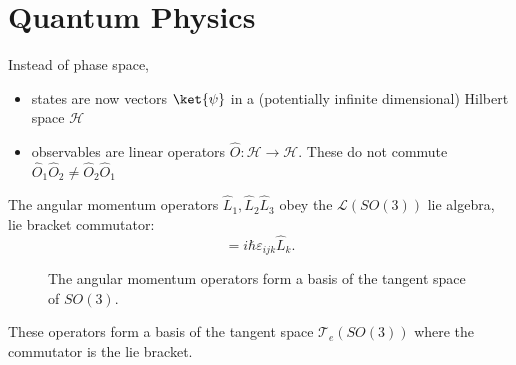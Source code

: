 \section{Quantum Physics}%
\label{sec:quantum_phyiscs}

Instead of phase space, 
\begin{itemize}
  \item states are now vectors $\ket{\psi}$ in a (potentially infinite dimensional) Hilbert space $\mathcal{H}$
  \item observables are linear operators $\hat O: \mathcal{H} \rightarrow \mathcal{H}$. These do not commute $\hat O_1 \hat O_2 \neq \hat O_2 \hat O_1$
\end{itemize}

The angular momentum operators $\hat L_1, \hat L_2 \hat L_3$ obey the $\mathcal{L}(SO(3))$ lie algebra, lie bracket commutator:
\begin{equation}
  [\hat L_i, \hat L_j] = i \hbar \varepsilon_{ijk} \hat L_k.
\end{equation}

\begin{figure}[htpb]
  \centering
  \def\svgwidth{0.3\columnwidth}
  
  \caption{The angular momentum operators form a basis of the tangent space of $SO(3)$.}
  \label{fig:so3}
\end{figure}

These operators form a basis of the tangent space $\mathcal{T}_e (SO(3))$ where the commutator is the lie bracket.

